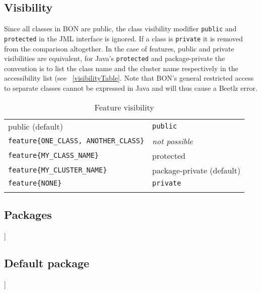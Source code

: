 \documentclass[11pt]{amsart}
\newcommand{\mytablebeg}{\begin{table}[h]\centering\begin{footnotesize}
\begin{tabular}{m{7cm}|m{7cm}} }
\newcommand{\mytableend}[2]{\end{tabular}\end{footnotesize}\caption{#1} \label{#2}\end{table}}
\newcommand{\simpleline}[2]{#1 & #2\\ \hdashline}
\begin{document}
\subsection{Visibility}\hfill \newline
Since all classes in BON are public, the class visibility modifier \texttt{public} and \texttt{protected} in the JML interface is ignored. If a class is \texttt{private} it is removed from the comparison altogether.
In the case of features, public and private visibilities are equivalent, for Java's \texttt{protected} and package-private the convention is to list the class name and the cluster name respectively in the accessibility list (see ~\autoref{visibilityTable}. Note that BON's general restricted access to separate classes cannot be expressed in Java and will thus cause a Beetlz error.
\mytablebeg
\simpleline{public (default)}{\texttt{public}}
\simpleline{\texttt{feature\{ONE\_CLASS, ANOTHER\_CLASS\}}}{\emph{not possible}}
\simpleline{\texttt{feature\{MY\_CLASS\_NAME\}}}{protected}
\simpleline{\texttt{feature\{MY\_CLUSTER\_NAME\}}}{package-private (default)}
\simpleline{\texttt{feature\{NONE\}}}{\texttt{private}}
\mytableend{Feature visibility}{visibilityTable}

\subsection{Packages}\hfill \newline
[[Does BON support now several packages, or still just the nearest? ]]



\subsection{Default package}\hfill \newline
[[What's the story with this? ]]

\end{document}
